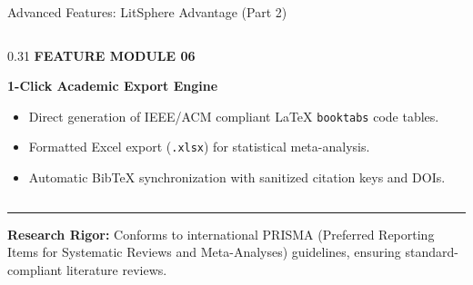 \documentclass[aspectratio=169,10pt]{beamer}
\begin{document}
\begin{frame}{Advanced Features: LitSphere Advantage (Part 2)}
\begin{columns}[T]
  \begin{column}{0.31\textwidth}
    {\fontsize{6.8pt}{8.5pt}\selectfont\bfseries\color{SubText} FEATURE MODULE 06}\par\vspace{2pt}
    {\fontsize{9.5pt}{11.5pt}\selectfont\bfseries\color{DarkText} 1-Click Academic Export Engine}\par\vspace{4pt}
    {\fontsize{7.2pt}{9.2pt}\selectfont\color{DarkText}
    \begin{itemize}
      \item Direct generation of IEEE/ACM compliant LaTeX \texttt{booktabs} code tables.
      \item Formatted Excel export (\texttt{.xlsx}) for statistical meta-analysis.
      \item Automatic BibTeX synchronization with sanitized citation keys and DOIs.
    \end{itemize}}
  \end{column}
\end{columns}

\vspace{0.45cm}
\rule{14.2cm}{0.4pt}\par\vspace{0.12cm}
{\fontsize{7.2pt}{9pt}\selectfont\color{DarkText}
\textbf{Research Rigor:} Conforms to international PRISMA (Preferred Reporting Items for Systematic Reviews and Meta-Analyses) guidelines, ensuring standard-compliant literature reviews.}
\end{frame}
\end{document}
